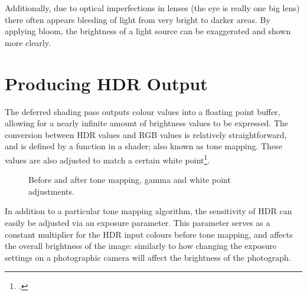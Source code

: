 \documentclass[11pt, oneside]{report}
\begin{document}
Additionally, due to optical imperfections in lenses (the eye is really one big lens) there often appears bleeding of light from very bright to darker areas. By applying \gls{bloom}, the brightness of a light source can be exaggerated and shown more clearly.

\section{Producing HDR Output}
The deferred shading pass outputs colour values into a \gls{floating point} buffer, allowing for a nearly infinite amount of brightness values to be expressed. The conversion between HDR values and \gls{RGB} values is relatively straightforward, and is defined by a function in a \gls{shader}; also known as \gls{tone mapping}. These values are also adjusted to match a certain \gls{white point}\footcite{hdr}.

\begin{figure}[!htbp]
  \centering
  \hfill
  \caption{Before and after \gls{tone mapping}, gamma and white point adjustments.}
\end{figure}

In addition to a particular \gls{tone mapping} algorithm, the sensitivity of \gls{HDR} can easily be adjusted via an exposure parameter. This parameter serves as a constant multiplier for the \gls{HDR} input colours before \gls{tone mapping}, and affects the overall brightness of the image: similarly to how changing the exposure settings on a photographic camera will affect the brightness of the photograph.
\end{document}
